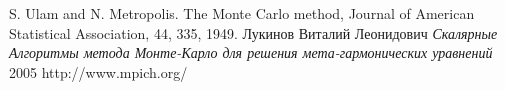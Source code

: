 \begin{thebibliography}{99}
		S. Ulam and N. Metropolis. The Monte Carlo method, Journal of American Statistical Association, 44, 335, 1949.
	 Лукинов Виталий Леонидович \emph{Скалярные Алгоритмы метода Монте-Карло для решения мета-гармонических уравнений} 2005
	http://www.mpich.org/
\end{thebibliography}
